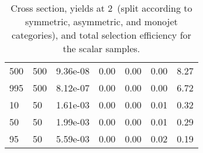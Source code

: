 \begin{table}
\begin{tabular}{lllllll}
500       &   500       &   9.36e-08  &   0.00      &   0.00      &   0.00      &   8.27      \\ 
995       &   500       &   8.12e-07  &   0.00      &   0.00      &   0.00      &   6.72      \\ 
10        &   50        &   1.61e-03  &   0.00      &   0.00      &   0.01      &   0.32      \\ 
50        &   50        &   1.99e-03  &   0.00      &   0.00      &   0.01      &   0.29      \\ 
95        &   50        &   5.59e-03  &   0.00      &   0.00      &   0.02      &   0.19      \\ 
\hline
\end{tabular}
\caption{Cross section, yields at 2~\ifb (split according to symmetric, asymmetric, and monojet categories), and total selection efficiency for the scalar \DMbb samples.}
\label{summaryTableAN_DMbbS_xs10_2p1fb_exp}
\end{table}

